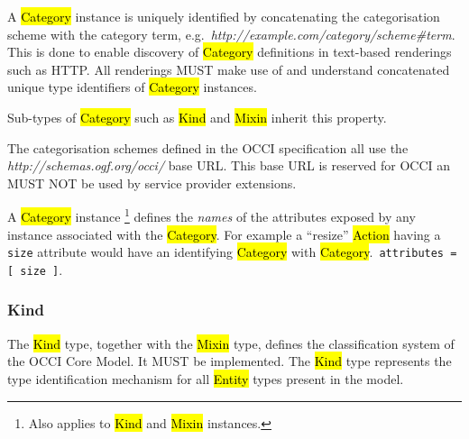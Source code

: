 \documentclass[10pt,a4paper]{article}
\begin{document}

A \hl{Category} instance is uniquely identified by concatenating the
categorisation scheme with the category term,
e.g.~\textit{http://example.com/category/scheme\#term}.  This is done
to enable discovery of \hl{Category} definitions in text-based
renderings such as HTTP. All renderings MUST make use of and
understand concatenated unique type identifiers of \hl{Category}
instances.

Sub-types of \hl{Category} such as \hl{Kind} and \hl{Mixin} inherit
this property.

The categorisation schemes defined in the OCCI specification all use
the \textit{http://schemas.ogf.org/occi/} base URL. This base URL is
reserved for OCCI an MUST NOT be used by service provider extensions.

A \hl{Category} instance
\footnote{Also applies to \hl{Kind} and \hl{Mixin} instances.}
defines the {\em names} of the attributes exposed by any instance associated
with the \hl{Category}.  For example a ``resize'' \hl{Action} having a {\tt
size} attribute would have an identifying \hl{Category} with \hl{Category}.{\tt
attributes = [ size ]}.

\subsubsection{Kind}
\label{sec:kind}

The \hl{Kind} type, together with the \hl{Mixin} type, defines the
classification system of the OCCI Core Model. It MUST be
implemented. The \hl{Kind} type represents the type identification
mechanism for all \hl{Entity} types present in the model.
\end{document}
